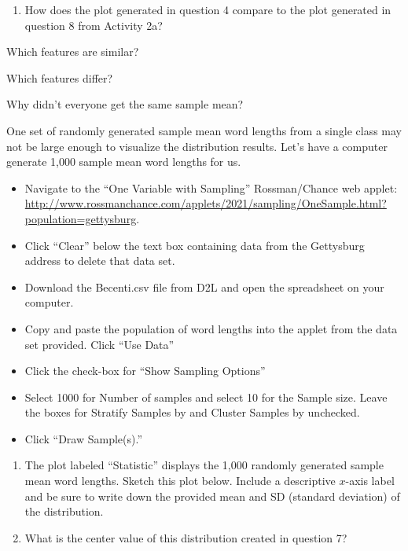 \documentclass[
]{report}
\providecommand{\tightlist}{%
  \setlength{\itemsep}{0pt}\setlength{\parskip}{0pt}}
\newcommand{\rgi}{\hspace{24pt}}  %
\begin{document}
\newpage

\begin{enumerate}
\def\labelenumi{\arabic{enumi}.}
\setcounter{enumi}{5}
\tightlist
\item
  How does the plot generated in question 4 compare to the plot generated in question 8 from Activity 2a?
\end{enumerate}

\rgi Which features are similar?\\
\vspace{0.4in}

\rgi Which features differ?

\vspace{0.4in}

\rgi Why didn't everyone get the same sample mean?
\vspace{0.4in}

One set of randomly generated sample mean word lengths from a single class may not be large enough to visualize the distribution results. Let's have a computer generate 1,000 sample mean word lengths for us.

\begin{itemize}
\item
  Navigate to the ``One Variable with Sampling'' Rossman/Chance web applet: \url{http://www.rossmanchance.com/applets/2021/sampling/OneSample.html?population=gettysburg}.
\item
  Click ``Clear'' below the text box containing data from the Gettysburg address to delete that data set.
\item
  Download the Becenti.csv file from D2L and open the spreadsheet on your computer.
\item
  Copy and paste the population of word lengths into the applet from the data set provided. Click ``Use Data''
\item
  Click the check-box for ``Show Sampling Options''
\item
  Select 1000 for Number of samples and select 10 for the Sample size. Leave the boxes for Stratify Samples by and Cluster Samples by unchecked.
\item
  Click ``Draw Sample(s).''
\end{itemize}

\begin{enumerate}
\def\labelenumi{\arabic{enumi}.}
\setcounter{enumi}{6}
\item
  The plot labeled ``Statistic'' displays the 1,000 randomly generated sample mean word lengths. Sketch this plot below. Include a descriptive \(x\)-axis label and be sure to write down the provided mean and SD (standard deviation) of the distribution.
  \vspace{1.5in}
\item
  What is the center value of this distribution created in question 7?
  \vspace{0.3in}
\end{enumerate}
\end{document}

